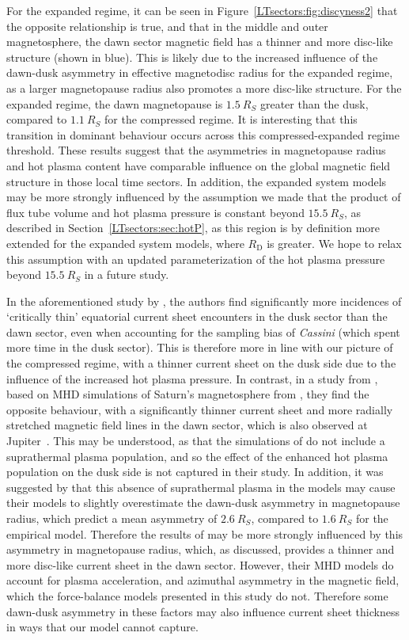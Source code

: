 For the expanded regime, it can be seen in Figure~\ref{LTsectors:fig:discyness2} that the opposite relationship is true, and that in the middle and outer magnetosphere, the dawn sector magnetic field has a thinner and more disc-like structure (shown in blue). This is likely due to the increased influence of the dawn-dusk asymmetry in effective magnetodisc radius for the expanded regime, as a larger magnetopause radius also promotes a more disc-like structure. For the expanded regime, the dawn magnetopause is $\SI{1.5}{R_S}$ greater than the dusk, compared to $\SI{1.1}{R_S}$ for the compressed regime. It is interesting that this transition in dominant behaviour occurs across this compressed-expanded regime threshold. These results suggest that the asymmetries in magnetopause radius and hot plasma content have comparable influence on the global magnetic field structure in those local time sectors. In addition, the expanded system models may be more strongly influenced by the assumption we made that the product of flux tube volume and hot plasma pressure is constant beyond $\SI{15.5}{R_S}$, as described in Section~\ref{LTsectors:sec:hotP}, as this region is by definition more extended for the expanded system models, where $R_\mathrm{D}$ is greater. We hope to relax this assumption with an updated parameterization of the hot plasma pressure beyond $\SI{15.5}{R_S}$ in a future study.

In the aforementioned study by \citet{delamere2015}, the authors find significantly more incidences of `critically thin' equatorial current sheet encounters in the dusk sector than the dawn sector, even when accounting for the sampling bias of \textit{Cassini} (which spent more time in the dusk sector). This is therefore more in line with our picture of the compressed regime, with a thinner current sheet on the dusk side due to the influence of the increased hot plasma pressure. In contrast, in a study from \citet{jia2016}, based on MHD simulations of Saturn's magnetosphere from \citet{jia2012b}, they find the opposite behaviour, with a significantly thinner current sheet and more radially stretched magnetic field lines in the dawn sector, which is also observed at Jupiter~\citep[e.g.][]{khurana2004}. This may be understood, as that the simulations of \citet{jia2012b} do not include a suprathermal plasma population, and so the effect of the enhanced hot plasma population on the dusk side is not captured in their study. In addition, it was suggested by \citet{pilkington2015b} that this absence of suprathermal plasma in the \citet{jia2012b} models may cause their models to slightly overestimate the dawn-dusk asymmetry in magnetopause radius, which predict a mean asymmetry of $\SI{2.6}{R_S}$, compared to $\SI{1.6}{R_S}$ for the \citet{pilkington2015b} empirical model. Therefore the results of \citet{jia2016} may be more strongly influenced by this asymmetry in magnetopause radius, which, as discussed, provides a thinner and more disc-like current sheet in the dawn sector. However, their MHD models do account for plasma acceleration, and azimuthal asymmetry in the magnetic field, which the force-balance models presented in this study do not. Therefore some dawn-dusk asymmetry in these factors may also influence current sheet thickness in ways that our model cannot capture.

